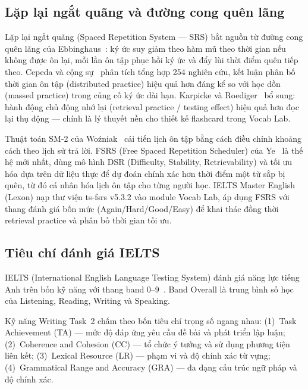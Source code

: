 \subsection{Lặp lại ngắt quãng và đường cong quên lãng}

Lặp lại ngắt quãng (Spaced Repetition System --- SRS) bắt nguồn từ đường cong quên lãng của Ebbinghaus~\cite{ebbinghaus1885gedachtnis}: ký ức suy giảm theo hàm mũ theo thời gian nếu không được ôn lại, mỗi lần ôn tập phục hồi ký ức và đẩy lùi thời điểm quên tiếp theo. Cepeda và cộng sự~\cite{cepeda2006distributed} phân tích tổng hợp 254 nghiên cứu, kết luận phân bố thời gian ôn tập (distributed practice) hiệu quả hơn đáng kể so với học dồn (massed practice) trong củng cố ký ức dài hạn. Karpicke và Roediger~\cite{karpicke2008critical} bổ sung: hành động chủ động nhớ lại (retrieval practice / testing effect) hiệu quả hơn đọc lại thụ động --- chính là lý thuyết nền cho thiết kế flashcard trong Vocab Lab.

Thuật toán SM-2 của Woźniak~\cite{wozniak1990spaced} cải tiến lịch ôn tập bằng cách điều chỉnh khoảng cách theo lịch sử trả lời. FSRS (Free Spaced Repetition Scheduler) của Ye~\cite{ye2022fsrs} là thế hệ mới nhất, dùng mô hình DSR (Difficulty, Stability, Retrievability) và tối ưu hóa dựa trên dữ liệu thực để dự đoán chính xác hơn thời điểm một từ sắp bị quên, từ đó cá nhân hóa lịch ôn tập cho từng người học. IELTS Master English (Lexon) nạp thư viện ts-fsrs v5.3.2 vào module Vocab Lab, áp dụng FSRS với thang đánh giá bốn mức (Again/Hard/Good/Easy) để khai thác đồng thời retrieval practice và phân bố thời gian tối ưu.

\subsection{Tiêu chí đánh giá IELTS}

IELTS (International English Language Testing System) đánh giá năng lực tiếng Anh trên bốn kỹ năng với thang band 0--9~\cite{ielts-global-stats}. Band Overall là trung bình số học của Listening, Reading, Writing và Speaking.

Kỹ năng Writing Task~2 chấm theo bốn tiêu chí trọng số ngang nhau: (1)~Task Achievement (TA) --- mức độ đáp ứng yêu cầu đề bài và phát triển lập luận; (2)~Coherence and Cohesion (CC) --- tổ chức ý tưởng và sử dụng phương tiện liên kết; (3)~Lexical Resource (LR) --- phạm vi và độ chính xác từ vựng; (4)~Grammatical Range and Accuracy (GRA) --- đa dạng cấu trúc ngữ pháp và độ chính xác.

